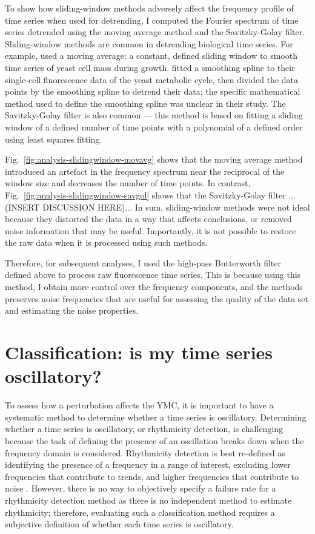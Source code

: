 To show how sliding-window methods adversely affect the frequency profile of time series when used for detrending, I computed the Fourier spectrum of time series detrended using the moving average method and the Savitzky-Golay filter.
Sliding-window methods are common in detrending biological time series.
For example, \textcite{cunyHighresolutionMassMeasurements2022} used a moving average: a constant, defined sliding window to smooth time series of yeast cell mass during growth.
\textcite{papagiannakisAutonomousMetabolicOscillations2017} fitted a smoothing spline to their single-cell fluorescence data of the yeast metabolic cycle, then divided the data points by the smoothing spline to detrend their data; the specific mathematical method used to define the smoothing spline was unclear in their study.
The Savitzky-Golay filter is also common --- this method is based on fitting a sliding window of a defined number of time points with a polynomial of a defined order using least squares fitting.

Fig.\ \ref{fig:analysis-slidingwindow-movavg} shows that the moving average method introduced an artefact in the frequency spectrum near the reciprocal of the window size and decreases the number of time points.
In contrast, Fig.\ \ref{fig:analysis-slidingwindow-savgol} shows that the Savitzky-Golay filter ...(INSERT DISCUSSION HERE)...
In sum, sliding-window methods were not ideal because they distorted the data in a way that affects conclusions, or removed noise information that may be useful.
Importantly, it is not possible to restore the raw data when it is processed using such methods.

Therefore, for subsequent analyses, I used the high-pass Butterworth filter defined above to process raw fluorescence time series.
This is because using this method, I obtain more control over the frequency components, and the methods preserves noise frequencies that are useful for assessing the quality of the data set and estimating the noise properties.


\section[Classification]{Classification: is my time series oscillatory?}
\label{sec:analysis-classification}

To assess how a perturbation affects the YMC, it is important to have a systematic method to determine whether a time series is oscillatory.
Determining whether a time series is oscillatory, or rhythmicity detection, is challenging because the task of defining the presence of an oscillation breaks down when the frequency domain is considered.
Rhythmicity detection is best re-defined as identifying the presence of a frequency in a range of interest, excluding lower frequencies that contribute to trends, and higher frequencies that contribute to noise \parencite{zielinskiStrengthsLimitationsPeriod2014}.
However, there is no way to objectively specify a failure rate for a rhythmicity detection method as there is no independent method to estimate rhythmicity; therefore, evaluating such a classification method requires a subjective definition of whether each time series is oscillatory.


